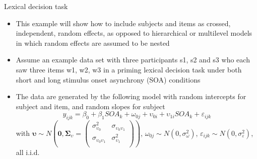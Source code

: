 \documentclass[aspectratio=169]{beamer}
\newcommand{\gvect}[1]{\boldsymbol{#1}}
\newcommand{\gmat}[1]{\boldsymbol{#1}}
\begin{document}
\begin{frame}[<+->]{Lexical decision task \citep{Baayen2008}}
  \begin{itemize}
    \item This example will show how to include subjects and items as
      crossed, independent, random effects, as opposed to hierarchical or
      multilevel models in which random effects are assumed to be nested
    \item Assume an example data set with three participants s1, s2 and s3
      who each saw three items w1, w2, w3 in a priming lexical decision
      task under both short and long stimulus onset asynchrony (SOA) conditions
    \item The data are generated by the following model with random intercepts
      for subject and item, and random slopes for subject
  \[
    y_{ijk} = \beta_0 + \beta_1 SOA_k + \omega_{0j} + \upsilon_{0i} +
      \upsilon_{1i} SOA_k + \varepsilon_{ijk} 
  \]
\small
with $\gvect{\upsilon} \sim N\left(\gvect{0}, \gmat{\Sigma}_{\upsilon} = 
    \begin{pmatrix}
      \sigma^2_{\upsilon_0} & \sigma_{\upsilon_0\upsilon_1} \\
      \sigma_{\upsilon_0\upsilon_1} & \sigma^2_{\upsilon_1} \\
    \end{pmatrix}\right)$,
      $\omega_{0j} \sim N(0, \sigma_{\omega}^2)$, $\varepsilon_{ijk} \sim N(0,
  \sigma_{\varepsilon}^2)$, all i.i.d. 
  \end{itemize}
\end{frame}
\end{document}
